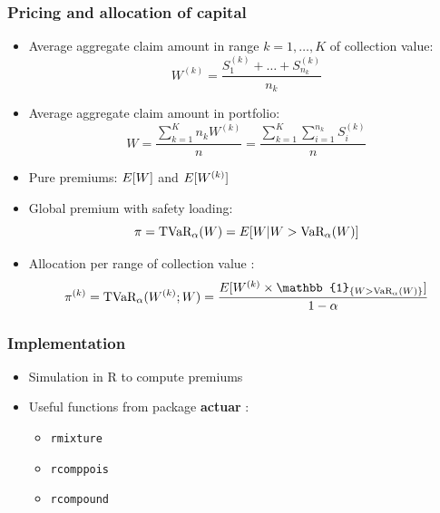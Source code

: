 \begin{frame}
  \frametitle{Pricing and allocation of capital}

  \begin{itemize}
  \item Average aggregate claim amount in range
    $k = 1, \dots, K$ of collection value:
    \begin{equation*}
      W^{(k)} = \frac{S_1^{(k)} + \dots + S_{n_k}^{(k)}}{n_k}
    \end{equation*}
  \item Average aggregate claim amount in portfolio:
    \begin{equation*}
      W = \frac{\sum_{k = 1}^K n_k W^{(k)}}{n}
      = \frac{\sum_{k = 1}^K \sum_{i = 1}^{n_k} S_i^{(k)}}{n}
    \end{equation*}
  \item<2-> Pure premiums: $E [ W ]$ and $E [ W^{(k)} ]$
  \item<3-> Global premium with safety loading:
    \begin{equation*}
      \pi = \text{TVaR}_\alpha(W) = E [ W|W > \text{VaR}_\alpha(W) ]
    \end{equation*}
  \item<4-> Allocation per range of collection value
    \citep[section~10.2.3]{Marceau:modelisation:2013}:
    \begin{equation*}
      \pi^{(k)} = \TVaR_\alpha(W^{(k)}; W) =
      \frac{\esp{W^{(k)} \times \mathbb{1}_{\{W > \VaR_\alpha(W)\}}}}{1 - \alpha}
    \end{equation*}
  \end{itemize}
\end{frame}

\begin{frame}
  \frametitle{Implementation}

  \begin{itemize}
  \item Simulation in R to compute premiums
  \item Useful functions from package \textbf{actuar} \citep{actuar}:
    \begin{itemize}
    \item[] \texttt{rmixture}
    \item[] \texttt{rcomppois}
    \item[] \texttt{rcompound}
    \end{itemize}
  \end{itemize}
\end{frame}

